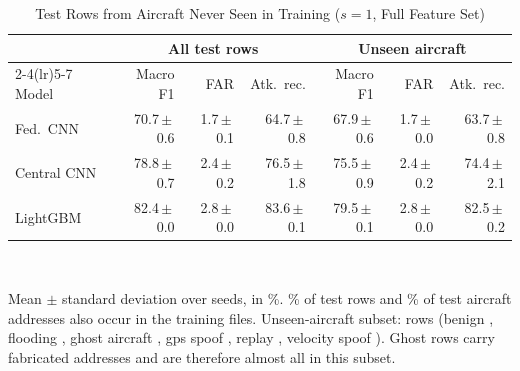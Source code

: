 \begin{table}[t]
\centering
\scriptsize
\caption{Test Rows from Aircraft Never Seen in Training ($s=1$, Full Feature Set)}
\label{tab:unseen}
\setlength{\tabcolsep}{3pt}
\begin{tabular}{lrrrrrr}
\toprule
& \multicolumn{3}{c}{All test rows} & \multicolumn{3}{c}{Unseen aircraft} \\
\cmidrule(lr){2-4}\cmidrule(lr){5-7}
Model & Macro F1 & FAR & Atk.\ rec. & Macro F1 & FAR & Atk.\ rec. \\
\midrule
Fed.\ CNN & 70.7{\,}$\pm${\,}0.6 & 1.7{\,}$\pm${\,}0.1 & 64.7{\,}$\pm${\,}0.8 & 67.9{\,}$\pm${\,}0.6 & 1.7{\,}$\pm${\,}0.0 & 63.7{\,}$\pm${\,}0.8 \\
Central CNN & 78.8{\,}$\pm${\,}0.7 & 2.4{\,}$\pm${\,}0.2 & 76.5{\,}$\pm${\,}1.8 & 75.5{\,}$\pm${\,}0.9 & 2.4{\,}$\pm${\,}0.2 & 74.4{\,}$\pm${\,}2.1 \\
LightGBM & 82.4{\,}$\pm${\,}0.0 & 2.8{\,}$\pm${\,}0.0 & 83.6{\,}$\pm${\,}0.1 & 79.5{\,}$\pm${\,}0.1 & 2.8{\,}$\pm${\,}0.0 & 82.5{\,}$\pm${\,}0.2 \\
\bottomrule
\end{tabular}
\\[2pt]
\parbox{\linewidth}{\scriptsize Mean $\pm$ standard deviation over  seeds, in \%. \% of test rows and \% of test aircraft addresses also occur in the training files. Unseen-aircraft subset:  rows (benign , flooding , ghost aircraft , gps spoof , replay , velocity spoof ). Ghost rows carry fabricated addresses and are therefore almost all in this subset.}
\end{table}
